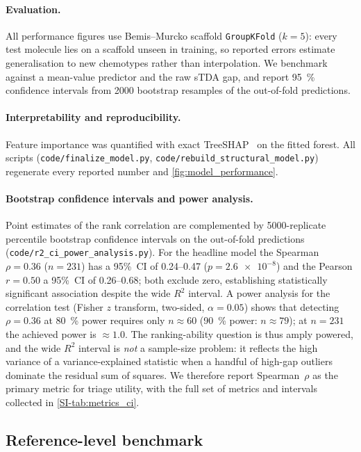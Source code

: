 \paragraph{Evaluation.}
All performance figures use Bemis--Murcko scaffold \texttt{GroupKFold}
($k=5$): every test molecule lies on a scaffold unseen in training, so reported
errors estimate generalisation to new chemotypes rather than interpolation.
We benchmark against a mean-value predictor and the raw sTDA gap, and report
\qty{95}{\percent} confidence intervals from \num{2000} bootstrap resamples of the
out-of-fold predictions.

\paragraph{Interpretability and reproducibility.}
Feature importance was quantified with exact TreeSHAP~\cite{Lundberg2017} on the
fitted forest. All scripts (\texttt{code/finalize\_model.py},
\texttt{code/rebuild\_structural\_model.py}) regenerate every reported number and
\cref{fig:model_performance}.

\paragraph{Bootstrap confidence intervals and power analysis.}
Point estimates of the rank correlation are complemented by
\num{5000}-replicate percentile bootstrap confidence intervals on the
out-of-fold predictions (\texttt{code/r2\_ci\_power\_analysis.py}).
For the headline model the Spearman $\rho = 0.36$ ($n = 231$) has a 95\%~CI of
\numrange{0.24}{0.47} ($p = \num{2.6e-8}$) and the Pearson $r = 0.50$ a 95\%~CI
of \numrange{0.26}{0.68}; both exclude zero, establishing statistically
significant association despite the wide $R^2$ interval.
A power analysis for the correlation test (Fisher $z$ transform, two-sided,
$\alpha = 0.05$) shows that detecting $\rho = 0.36$ at \qty{80}{\percent} power
requires only $n \approx 60$ (\qty{90}{\percent} power: $n \approx 79$); at
$n = 231$ the achieved power is $\approx 1.0$. The ranking-ability question is
thus amply powered, and the wide $R^2$ interval is \emph{not} a sample-size
problem: it reflects the high variance of a variance-explained statistic when a
handful of high-gap outliers dominate the residual sum of squares. We therefore
report Spearman~$\rho$ as the primary metric for triage utility, with the full
set of metrics and intervals collected in \cref{SI-tab:metrics_ci}.

\subsection{Reference-level benchmark}

